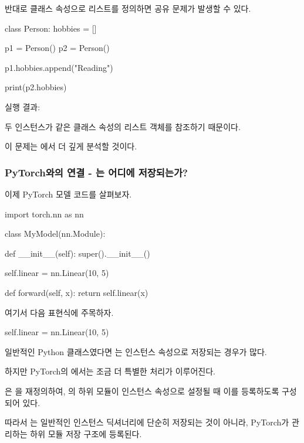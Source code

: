 반대로 클래스 속성으로 리스트를 정의하면 공유 문제가 발생할 수 있다.

\begin{dhkcode}
class Person:
    hobbies = []


p1 = Person()
p2 = Person()

p1.hobbies.append("Reading")

print(p2.hobbies)
\end{dhkcode}

실행 결과:

\begin{dhkzsh}
['Reading']
\end{dhkzsh}

두 인스턴스가 같은 클래스 속성의 리스트 객체를 참조하기 때문이다.

이 문제는 에서 더 깊게 분석할 것이다.

\subsubsection{PyTorch와의 연결 - 는 어디에 저장되는가?}

이제 PyTorch 모델 코드를 살펴보자.

\begin{dhkcode}
import torch.nn as nn


class MyModel(nn.Module):

    def __init__(self):
        super().__init__()

        self.linear = nn.Linear(10, 5)

    def forward(self, x):
        return self.linear(x)
\end{dhkcode}

여기서 다음 표현식에 주목하자.

\begin{dhkcode}
self.linear = nn.Linear(10, 5)
\end{dhkcode}

일반적인 Python 클래스였다면 는 인스턴스 속성으로 저장되는 경우가 많다.

하지만 PyTorch의 에서는 조금 더 특별한 처리가 이루어진다.

은 을 재정의하여, 의 하위 모듈이 인스턴스 속성으로 설정될 때 이를 등록하도록 구성되어 있다.

따라서 는 일반적인 인스턴스 딕셔너리에 단순히 저장되는 것이 아니라, PyTorch가 관리하는 하위 모듈 저장 구조에 등록된다.

